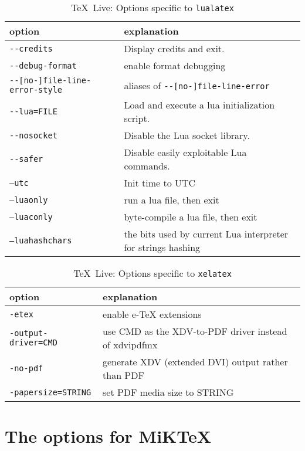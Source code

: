 \documentclass{article}
\newcommand{\lualatex}{\texttt{lualatex}}
\newcommand{\xelatex}{\texttt{xelatex}}
\newcommand{\texlive}{\TeX~Live}
\newcommand{\miktex}{MiKTeX}
\begin{document}
{\small
\begin{longtable}{|ll|}
\toprule
option & explanation \\
\midrule
\midrule
\endfirsthead%
\bottomrule
\caption{\label{tab:latexOptionsLualatexTexlive} \texlive: Options specific to \lualatex{} }
\endlastfoot%
\texttt{-{}-credits}                    & Display credits and exit. \\
\texttt{-{}-debug-format}               & enable format debugging \\
\texttt{-{}-[no-]file-line-error-style} & aliases of \texttt{-{}-[no-]file-line-error} \\
\texttt{-{}-lua=FILE}                   & Load and execute a lua initialization script. \\
\texttt{-{}-nosocket}                   & Disable the Lua socket library. \\
\texttt{-{}-safer}                      & Disable easily exploitable Lua commands. \\
\texttt{--utc}                          & Init time to UTC \\
\midrule
\texttt{--luaonly}                      & run a lua file, then exit \\
\texttt{--luaconly}                     & byte-compile a lua file, then exit \\
\texttt{--luahashchars}                 & the bits used by current Lua interpreter for strings hashing \\
\end{longtable}
}


{\small
\begin{longtable}{|ll|}
\toprule
option & explanation \\
\midrule
\midrule
\endfirsthead%
\bottomrule
\caption{\label{tab:latexOptionsXelatexTexlive} \texlive: Options specific to \xelatex{} }
\endlastfoot%
\texttt{-etex}                   & enable e-TeX extensions \\
\texttt{-output-driver=CMD}      & use CMD as the XDV-to-PDF driver instead of xdvipdfmx \\
\texttt{-no-pdf}                 & generate XDV (extended DVI) output rather than PDF \\
\texttt{-papersize=STRING}       & set PDF media size to STRING \\
\end{longtable}
}

\section{The options for \miktex}\label{sec:optionsMiktex}
\end{document}
